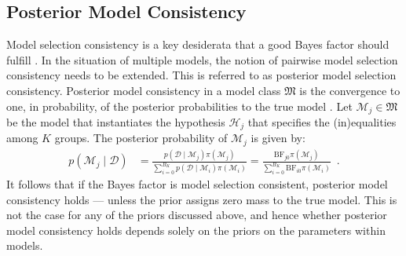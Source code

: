 \documentclass[11pt,a4paper]{article}
\theoremstyle{definition} %
\theoremstyle{case}
\newcommand{\prior}[1]{\pi\left({#1}\right)}
\newcommand{\bellnum}[1]{B_{#1}}
\newcommand{\rbellnum}[2]{B_{#1,\,#2}}
\newcommand{\numberthis}{\addtocounter{equation}{1}\tag{\theequation}}
\begin{document}

\subsection{Posterior Model Consistency}
Model selection consistency is a key desiderata that a good Bayes factor should fulfill \parencite[e.g.,][]{bayarri2012criteria, ly2016harold, consonni2018prior}. In the situation of multiple models, the notion of pairwise model selection consistency needs to be extended. This is referred to as posterior model selection consistency. Posterior model consistency in a model class $\mathfrak{M}$ is the convergence to one, in probability, of the posterior probabilities to the true model \parencite[e.g.,][]{casella2009consistency, moreno2015posterior}. Let $\mathcal{M}_j \in \mathfrak{M}$ be the model that instantiates the hypothesis $\mathcal{H}_j$ that specifies the (in)equalities among $K$ groups. The posterior probability of $\mathcal{M}_j$ is given by:
\begin{align}
    p(\mathcal{M}_j \mid \mathcal{D}) &= \frac{p(\mathcal{D} \mid \mathcal{M}_j) \pi(\mathcal{M}_j)}{\sum_{i = 0}^{\bellnum{K}} p(\mathcal{D} \mid \mathcal{M}_i) \pi(\mathcal{M}_i)} 
    = \frac{\text{BF}_{j0}\pi(\mathcal{M}_j)}{\sum_{i = 0}^{\bellnum{K}} \text{BF}_{i0} \pi(\mathcal{M}_i)} \enspace .
\end{align}
It follows that if the Bayes factor is model selection consistent, posterior model consistency holds \parencite[see also][Theorem 1]{moreno2015posterior} --- unless the prior assigns zero mass to the true model. This is not the case for any of the priors discussed above, and hence whether posterior model consistency holds depends solely on the priors on the parameters within models.
\end{document}
